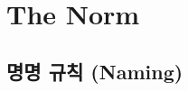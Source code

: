 \documentclass{42-ko}
\begin{document}
\newpage

\chapter{The Norm}


    \section{명명 규칙 (Naming)}
\end{document}
